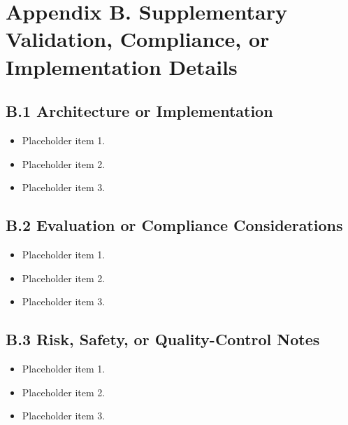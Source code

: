 \documentclass[Afour,sagev,times]{sagej}
\begin{document}
\section*{Appendix B. Supplementary Validation, Compliance, or Implementation Details}


\subsection*{B.1 Architecture or Implementation}

\begin{itemize}[leftmargin=*,itemsep=3pt]
    \item Placeholder item 1.
    \item Placeholder item 2.
    \item Placeholder item 3.
\end{itemize}

\subsection*{B.2 Evaluation or Compliance Considerations}

\begin{itemize}[leftmargin=*,itemsep=3pt]
    \item Placeholder item 1.
    \item Placeholder item 2.
    \item Placeholder item 3.
\end{itemize}

\subsection*{B.3 Risk, Safety, or Quality-Control Notes}

\begin{itemize}[leftmargin=*,itemsep=3pt]
    \item Placeholder item 1.
    \item Placeholder item 2.
    \item Placeholder item 3.
\end{itemize}



\end{document}
